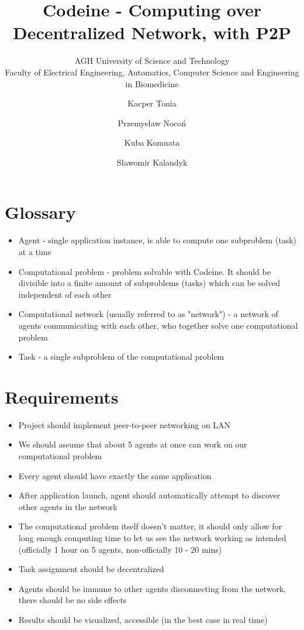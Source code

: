 \documentclass{article}
\title{Codeine - Computing over Decentralized Network, with P2P}
\subtitle{AGH University of Science and Technology\\
    Faculty of Electrical Engineering, Automatics, Computer Science and Engineering in Biomedicine}
\author{Kacper Tonia\and
        Przemysław Nocoń\and
        Kuba Komnata\and
        Sławomir Kalandyk}
\date{}
\begin{document}
\maketitle

\section{Glossary}
\begin{itemize}
    \item Agent - single application instance, is able to compute one subproblem (task) at a time
    \item Computational problem - problem solvable with Codeine. It should be divisible into a finite amount of subproblems (tasks) which can be solved independent of each other
    \item Computational network (usually referred to as "network") - a network of agents communicating with each other, who together solve one computational problem
    \item Task - a single subproblem of the computational problem
\end{itemize}

\section{Requirements}
\begin{itemize}
    \item Project should implement peer-to-peer networking on LAN
    \item We should assume that about 5 agents at once can work on our computational problem
    \item Every agent should have exactly the same application
    \item After application launch, agent should automatically attempt to discover other agents in the network
    \item The computational problem itself doesn't matter, it should only allow for long enough computing time to let us see the network working as intended (officially 1 hour on 5 agents, non-officially 10 - 20 mins)
    \item Task assignment should be decentralized
    \item Agents should be immune to other agents disconnecting from the network, there should be no side effects
    \item Results should be visualized, accessible (in the best case in real time)
\end{itemize}
\end{document}
